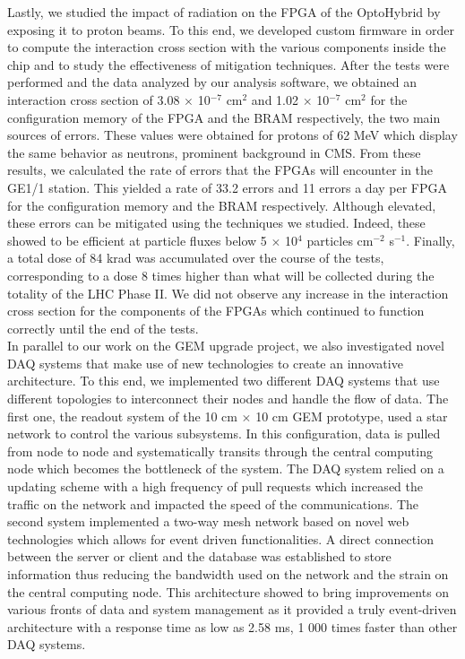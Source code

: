   Lastly, we studied the impact of radiation on the FPGA of the OptoHybrid by exposing it to proton beams. To this end, we developed custom firmware in order to compute the interaction cross section with the various components inside the chip and to study the effectiveness of mitigation techniques. After the tests were performed and the data analyzed by our analysis software, we obtained an interaction cross section of 3.08 $ \times $ 10$^{-7}$ cm$^{2}$ and 1.02 $ \times $ 10$^{-7}$ cm$^{2}$ for the configuration memory of the FPGA and the BRAM respectively, the two main sources of errors. These values were obtained for protons of 62 MeV which display the same behavior as neutrons, prominent background in CMS. From these results, we calculated the rate of errors that the FPGAs will encounter in the GE1/1 station. This yielded a rate of 33.2 errors and 11 errors a day per FPGA for the configuration memory and the BRAM respectively. Although elevated, these errors can be mitigated using the techniques we studied. Indeed, these showed to be efficient at particle fluxes below 5 $ \times $ 10$^4$ particles cm$^{-2}$ s$^{-1}$. Finally, a total dose of 84 krad was accumulated over the course of the tests, corresponding to a dose 8 times higher than what will be collected during the totality of the LHC Phase II. We did not observe any increase in the interaction cross section for the components of the FPGAs which continued to function correctly until the end of the tests. \\

  In parallel to our work on the GEM upgrade project, we also investigated novel DAQ systems that make use of new technologies to create an innovative architecture. To this end, we implemented two different DAQ systems that use different topologies to interconnect their nodes and handle the flow of data. The first one, the readout system of the 10 cm $ \times $ 10 cm GEM prototype, used a star network to control the various subsystems. In this configuration, data is pulled from node to node and systematically transits through the central computing node which becomes the bottleneck of the system. The DAQ system relied on a updating scheme with a high frequency of pull requests which increased the traffic on the network and impacted the speed of the communications. The second system implemented a two-way mesh network based on novel web technologies which allows for event driven functionalities. A direct connection between the server or client and the database was established to store information thus reducing the bandwidth used on the network and the strain on the central computing node. This architecture showed to bring improvements on various fronts of data and system management as it provided a truly event-driven architecture with a response time as low as 2.58 ms, 1 000 times faster than other DAQ systems.
